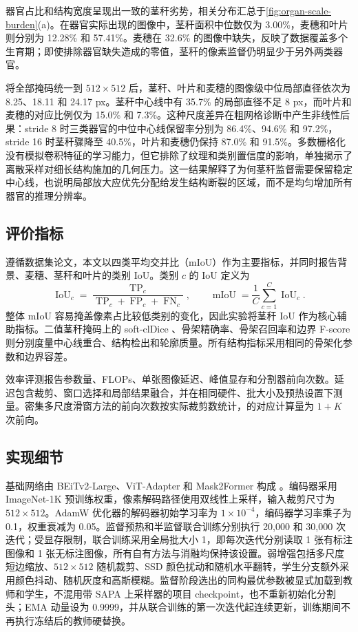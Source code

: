 器官占比和结构宽度呈现出一致的茎秆劣势，相关分布汇总于\cref{fig:organ-scale-burden}(a)。在器官实际出现的图像中，茎秆面积中位数仅为 3.00\%，麦穗和叶片则分别为 12.28\% 和 57.41\%。麦穗在 32.6\% 的图像中缺失，反映了数据覆盖多个生育期；即使排除器官缺失造成的零值，茎秆的像素监督仍明显少于另外两类器官。

将全部掩码统一到 $512\times512$ 后，茎秆、叶片和麦穗的图像级中位局部直径依次为 8.25、18.11 和 24.17 px。茎秆中心线中有 35.7\% 的局部直径不足 8 px，而叶片和麦穗的对应比例仅为 15.0\% 和 7.3\%。这种尺度差异在粗网格诊断中产生非线性后果：stride 8 时三类器官的中位中心线保留率分别为 86.4\%、94.6\% 和 97.2\%，stride 16 时茎秆骤降至 40.5\%，叶片和麦穗仍保持 87.0\% 和 91.5\%。多数栅格化没有模拟卷积特征的学习能力，但它排除了纹理和类别置信度的影响，单独揭示了离散采样对细长结构施加的几何压力。这一结果解释了为何茎秆监督需要保留稳定中心线，也说明局部放大应优先分配给发生结构断裂的区域，而不是均匀增加所有器官的推理分辨率。

\subsection{评价指标}

遵循数据集论文，本文以四类平均交并比（mIoU）作为主要指标，并同时报告背景、麦穗、茎秆和叶片的类别 IoU。类别 $c$ 的 IoU 定义为
\begin{equation}
\operatorname{IoU}_c=
\frac{\operatorname{TP}_c}
{\operatorname{TP}_c+\operatorname{FP}_c+\operatorname{FN}_c},
\qquad
\operatorname{mIoU}=\frac{1}{C}\sum_{c=1}^{C}\operatorname{IoU}_c .
\end{equation}
整体 mIoU 容易掩盖像素占比较低类别的变化，因此实验将茎秆 IoU 作为核心辅助指标。二值茎秆掩码上的 soft-clDice \citep{shit2021cldice}、骨架精确率、骨架召回率和边界 F-score 则分别度量中心线重合、结构检出和轮廓质量。所有结构指标采用相同的骨架化参数和边界容差。

效率评测报告参数量、FLOPs、单张图像延迟、峰值显存和分割器前向次数。延迟包含裁剪、窗口选择和局部结果融合，并在相同硬件、批大小及预热设置下测量。密集多尺度滑窗方法的前向次数按实际裁剪数统计，\BAZR 的对应计算量为 $1+K$ 次前向。

\subsection{实现细节}
\label{sec:implementation}

基础网络由 BEiTv2-Large、ViT-Adapter 和 Mask2Former 构成 \citep{peng2022beitv2,chen2023vitadapter,cheng2022mask2former}。编码器采用 ImageNet-1K 预训练权重，像素解码路径使用双线性上采样，输入裁剪尺寸为 $512\times512$。AdamW 优化器的解码器初始学习率为 $1\times10^{-4}$，编码器学习率乘子为 0.1，权重衰减为 0.05。监督预热和半监督联合训练分别执行 20,000 和 30,000 次迭代；受显存限制，联合训练采用全局批大小 1，即每次迭代分别读取 1 张有标注图像和 1 张无标注图像，所有自有方法与消融均保持该设置。弱增强包括多尺度短边缩放、$512\times512$ 随机裁剪、SSD 颜色扰动和随机水平翻转，学生分支额外采用颜色抖动、随机灰度和高斯模糊。监督阶段选出的同构最优参数被显式加载到教师和学生，不混用带 SAPA 上采样器的项目 checkpoint，也不重新初始化分割头；EMA 动量设为 0.9999，并从联合训练的第一次迭代起连续更新，训练期间不再执行冻结后的教师硬替换。

